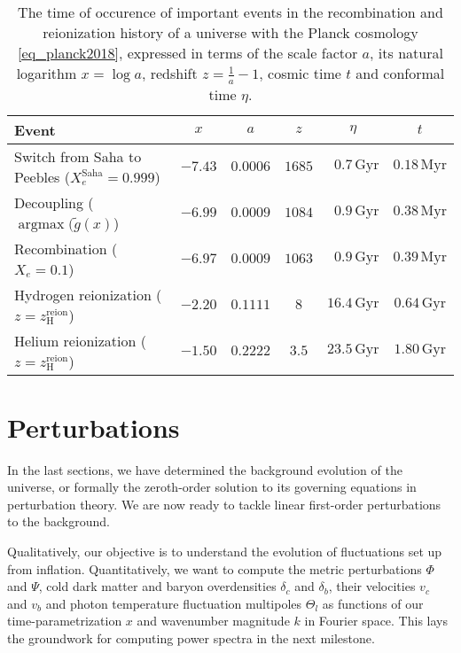 \documentclass[10pt,a4paper]{article}
\DeclareMathOperator{\argmax}{argmax}
\begin{document}
\begin{table}[b]
\centering
\caption{%
	The time of occurence of important events in the recombination and reionization history of a universe with the Planck cosmology \eqref{eq_planck2018},
	expressed in terms of the scale factor $a$, its natural logarithm $x = \log a$, redshift $z = \frac1a - 1$, cosmic time $t$ and conformal time $\eta$.
}
\label{table_times2}
\begin{tabular}{l c c c c c}
	\toprule
	Event                                                               & $x$     & $a$       & $z$    & $\eta$    & $t$ \\
	\midrule
	Switch from Saha to Peebles ($X_e^\text{Saha} = 0.999$) & $-7.43$ & $0.0006$  & $1685$ & $\phantom{0}0.7\,\mathrm{Gyr}$ & $0.18\,\mathrm{Myr}$ \\
	Decoupling ($\argmax(\tilde{g}(x)$)                     & $-6.99$ & $0.0009$  & $1084$ & $\phantom{0}0.9\,\mathrm{Gyr}$ & $0.38\,\mathrm{Myr}$ \\
	Recombination ($X_e = 0.1$)                             & $-6.97$ & $0.0009$  & $1063$ & $\phantom{0}0.9\,\mathrm{Gyr}$ & $0.39\,\mathrm{Myr}$ \\
	Hydrogen reionization ($z = z^\text{reion}_\text{H}$)   & $-2.20$ & $0.1111$  & $8$    & $16.4\,\mathrm{Gyr}$ & $0.64\,\mathrm{Gyr}$ \\
	Helium reionization ($z = z^\text{reion}_\text{H}$)     & $-1.50$ & $0.2222$  & $3.5$  & $23.5\,\mathrm{Gyr}$ & $1.80\,\mathrm{Gyr}$ \\
	\bottomrule
\end{tabular}
\end{table}



\clearpage
\section{Perturbations}

\newcommand\N{\mathcal{N}}
\newcommand\aH{\mathcal{H}}

In the last sections, we have determined the background evolution of the universe,
or formally the zeroth-order solution to its governing equations in perturbation theory.
We are now ready to tackle linear first-order perturbations to the background.

Qualitatively, our objective is to understand the evolution of fluctuations set up from inflation.
Quantitatively, we want to compute the
metric perturbations $\Phi$ and $\Psi$,
cold dark matter and baryon overdensities $\delta_c$ and $\delta_b$,
their velocities $v_c$ and $v_b$
and photon temperature fluctuation multipoles $\Theta_l$
as functions of our time-parametrization $x$ and wavenumber magnitude $k$ in Fourier space.
This lays the groundwork for computing power spectra in the next milestone.
\end{document}
